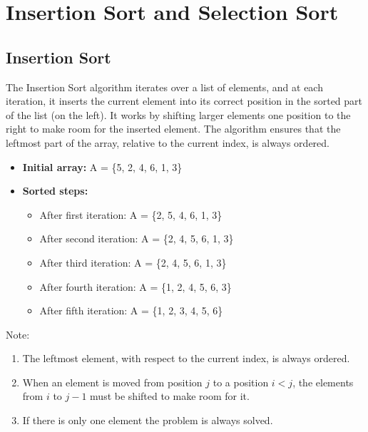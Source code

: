 \chapter{Insertion Sort and Selection Sort}
    \section{Insertion Sort}
    The Insertion Sort algorithm iterates over a list of elements, and at each iteration, it inserts the current element into its correct position in the sorted part of the list (on the left). It works by shifting larger elements one position to the right to make room for the inserted element. The algorithm ensures that the leftmost part of the array, relative to the current index, is always ordered.
    \begin{itemize}
        \item \textbf{Initial array:} A = \{5, 2, 4, 6, 1, 3\}
        \item \textbf{Sorted steps:}
        \begin{itemize}
            \item After first iteration: A = \{2, 5, 4, 6, 1, 3\}
            \item After second iteration: A = \{2, 4, 5, 6, 1, 3\}
            \item After third iteration: A = \{2, 4, 5, 6, 1, 3\}
            \item After fourth iteration: A = \{1, 2, 4, 5, 6, 3\}
            \item After fifth iteration: A = \{1, 2, 3, 4, 5, 6\}
        \end{itemize}
    \end{itemize}
    Note:
    \begin{enumerate}
        \item The leftmost element, with respect to the current index, is always ordered.
        \item When an element is moved from position $j$ to a position $i < j$, the elements from $i$ to $j-1$ must be shifted to make room for it.
        \item If there is only one element the problem is always solved.
    \end{enumerate}
